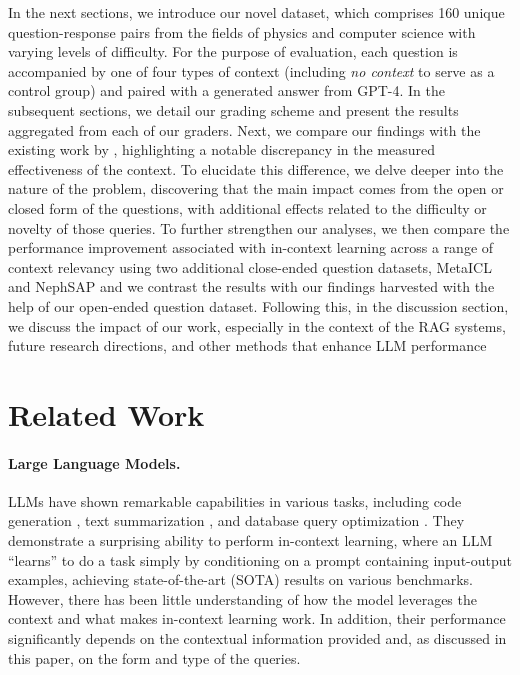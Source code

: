 \documentclass{article}
\begin{document}
    In the next sections, we introduce our novel dataset, which comprises 160 unique question-response pairs from the fields of physics and computer science with varying levels of difficulty. For the purpose of evaluation, each question is accompanied by one of four types of context (including \emph{no context} to serve as a control group) and paired with a generated answer from GPT-4. In the subsequent sections, we detail our grading scheme and present the results aggregated from each of our graders. Next, we compare our findings with the existing work by \citet{min2022rethinking}, highlighting a notable discrepancy in the measured effectiveness of the context. To elucidate this difference, we delve deeper into the nature of the problem, discovering that the main impact comes from the open or closed form of the questions, with additional effects related to the difficulty or novelty of those queries.
    To further strengthen our analyses, we then compare the performance improvement associated with in-context learning across a range of context relevancy using two additional close-ended question datasets, MetaICL \citep{min2022metaicl} and NephSAP \citep{wu2023openicl} and we contrast the results with our findings harvested with the help of our open-ended question dataset. Following this, in the discussion section, we discuss the impact of our work, especially in the context of the RAG systems, future research directions, and other methods that enhance LLM performance 
    
\section{Related Work}

    \paragraph{Large Language Models.}
    LLMs have shown remarkable capabilities in various tasks, including code generation \citep{kojima2023large, siddiq2023generate}, text summarization \citep{sahu2023enchancing}, and database query optimization \citep{Li2023}. They demonstrate a surprising ability to perform in-context learning, where an LLM ``learns'' to do a task simply by conditioning on a prompt containing input-output examples, achieving state-of-the-art (SOTA) results on various benchmarks. However, there has been little understanding of how the model leverages the context and what makes in-context learning work.
    In addition, their performance significantly depends on the contextual information provided and, as discussed in this paper, on the form and type of the queries.
\end{document}
